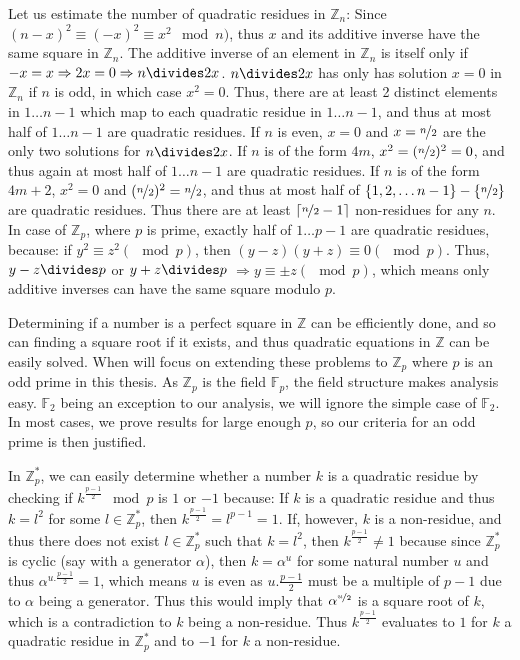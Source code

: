 \documentclass{report}
\begin{document}
Let us estimate the number of quadratic residues in $\mathbb{Z}_n$: Since $(n-x)^2\equiv(-x)^2\equiv x^2 \mod n)$, thus $x$ and its additive inverse have the same square in $\mathbb{Z}_n$. The additive inverse of an element in $\mathbb{Z}_n$ is itself only if $-x=x \Rightarrow 2x=0 \Rightarrow n \divides 2x$. $n \divides 2x$ has only has solution $x=0$ in $\mathbb{Z}_n$ if $n$ is odd, in which case $x^2=0$. Thus, there are at least 2 distinct elements in $1\ldots n-1$ which map to each quadratic residue in $1\ldots n-1$, and thus at most half of $1\ldots n-1$ are quadratic residues. If $n$ is even, $x=0$ and $x=\nicefrac{n}{2}$ are the only two solutions for $n \divides 2x$. If $n$ is of the form $4m$, $x^2=(\nicefrac{n}{2})^2=0$, and thus again at most half of $1\ldots n-1$ are quadratic residues. If $n$ is of the form $4m+2$, $x^2=0$ and $(\nicefrac{n}{2})^2=\nicefrac{n}{2}$, and thus at most half of $\{1,2,\ldots n-1\}-\{ \nicefrac{n}{2} \}$ are quadratic residues. Thus there are at least $\lceil \nicefrac{n}{2}-1\rceil$ non-residues for any $n$. In case of $\mathbb{Z}_p$, where $p$ is prime, exactly half of $1\ldots p-1$ are quadratic residues, because: if $y^2\equiv z^2 (\mod p)$, then $(y-z)(y+z)\equiv 0(\mod p)$. Thus, $y-z\divides p$ or $y+z\divides p$ $\Rightarrow y\equiv \pm z (\mod p)$, which means only additive inverses can have the same square modulo $p$.

Determining if a number is a perfect square in $\mathbb{Z}$ can be efficiently done, and so can finding a square root if it exists, and thus quadratic equations in $\mathbb{Z}$ can be easily solved. When will focus on extending these problems to $\mathbb{Z}_p$ where $p$ is an odd prime in this thesis. As $\mathbb{Z}_p$ is the field $\mathbb{F}_p$, the field structure makes analysis easy. $\mathbb{F}_2$ being an exception to our analysis, we will ignore the simple case of $\mathbb{F}_2$. In most cases, we prove results for large enough $p$, so our criteria for an odd prime is then justified.

In $\mathbb{Z}^*_p$, we can easily determine whether a number $k$ is a quadratic residue by checking if $k^{\frac{p-1}{2}} \mod p$ is $1$ or $-1$ because: If $k$ is a quadratic residue and thus $k=l^2$ for some $l \in\mathbb{Z}^*_p$, then $k^{\frac{p-1}{2}} = l^{p-1}=1$. If, however, $k$ is a non-residue, and thus there does not exist $l \in\mathbb{Z}^*_p$ such that $k=l^2$, then $k^{\frac{p-1}{2}} \neq 1$ because since $\mathbb{Z}^*_p$ is cyclic (say with a generator $\alpha$), then $k=\alpha^{u}$ for some natural number $u$ and thus $\alpha^{u.\frac{p-1}{2}} = 1$, which means $u$ is even as $u.\frac{p-1}{2}$ must be a multiple of $p-1$ due to $\alpha$ being a generator. Thus this would imply that $\alpha^{\nicefrac{u}{2}}$ is a square root of $k$, which is a contradiction to $k$ being a non-residue. Thus $k^{\frac{p-1}{2}}$ evaluates to $1$ for $k$ a quadratic residue in $\mathbb{Z}^*_p$ and to $-1$ for $k$ a non-residue.
\end{document}
